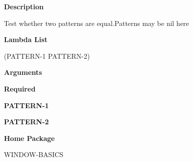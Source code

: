  
{\bf Description}

Test whether two patterns are equal.Patterns may be nil here

 
{\bf Lambda List}

(PATTERN-1 PATTERN-2)

 
{\bf Arguments}


\beginhang
{\bf Required}\hspace{2em}
 
{\bf PATTERN-1}


 
{\bf PATTERN-2}


 
\endhang
 
{\bf Home Package}

WINDOW-BASICS

